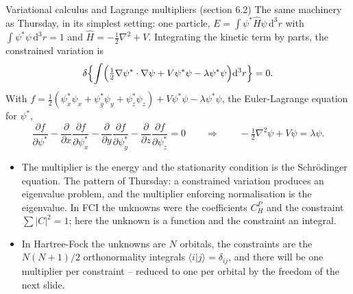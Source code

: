 \documentclass[aspectratio=169,10pt]{beamer}
\newcommand{\braket}[2]{\langle #1\vert #2\rangle}
\newcommand{\dd}{\mathrm{d}}
\begin{document}
\begin{frame}{Variational calculus and Lagrange multipliers (section 6.2)}
  \small
  The same machinery as Thursday, in its simplest setting: one particle, $E=\int\psi^{*}\hat{H}\psi\,\dd^3r$ with $\int\psi^{*}\psi\,\dd^3r=1$ and $\hat{H}=-\frac12\nabla^2+V$. Integrating the kinetic term by parts, the constrained variation is
  \[
    \delta\Bigl\{\int\Bigl(\tfrac12\nabla\psi^{*}\cdot\nabla\psi+V\psi^{*}\psi-\lambda\psi^{*}\psi\Bigr)\dd^3r\Bigr\}=0 .
  \]
  With $f=\frac12(\psi_x^{*}\psi_x+\psi_y^{*}\psi_y+\psi_z^{*}\psi_z)+V\psi^{*}\psi-\lambda\psi^{*}\psi$, the Euler-Lagrange equation for $\psi^{*}$,
  \[
    \frac{\partial f}{\partial\psi^{*}}-\frac{\partial}{\partial x}\frac{\partial f}{\partial\psi_x^{*}}-\frac{\partial}{\partial y}\frac{\partial f}{\partial\psi_y^{*}}-\frac{\partial}{\partial z}\frac{\partial f}{\partial\psi_z^{*}}=0
    \qquad\Longrightarrow\qquad
    -\tfrac12\nabla^2\psi+V\psi=\lambda\psi .
  \]
  \begin{itemize}
    \item The multiplier is the energy and the stationarity condition is the Schr\"odinger equation. \alert{The pattern of Thursday}: a constrained variation produces an eigenvalue problem, and the multiplier enforcing normalisation is the eigenvalue. In FCI the unknowns were the coefficients $C_H^P$ and the constraint $\sum|C|^2=1$; here the unknown is a function and the constraint an integral.
    \item In Hartree-Fock the unknowns are $N$ orbitals, the constraints are the $N(N+1)/2$ orthonormality integrals $\braket{i}{j}=\delta_{ij}$, and there will be one multiplier per constraint -- reduced to one per orbital by the freedom of the next slide.
  \end{itemize}
\end{frame}
\end{document}

